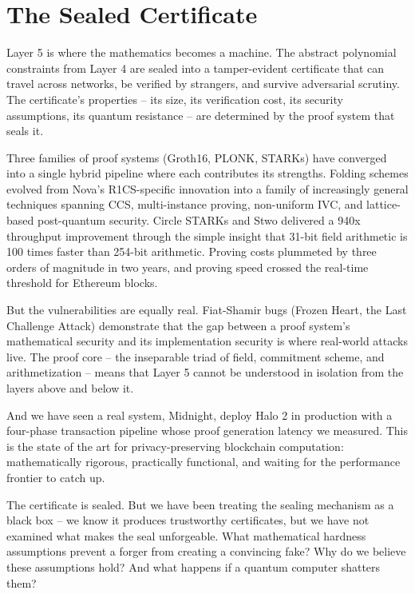 \documentclass[
  11pt,
  openany]{report}
\begin{document}
\section{The Sealed Certificate}\label{the-sealed-certificate}

Layer 5 is where the mathematics becomes a machine. The abstract polynomial
constraints from Layer 4 are sealed into a tamper-evident certificate that can
travel across networks, be verified by strangers, and survive adversarial
scrutiny. The certificate's properties -- its size, its verification cost, its
security assumptions, its quantum resistance -- are determined by the proof
system that seals it.

Three families of proof systems (Groth16, PLONK, STARKs) have converged into a
single hybrid pipeline where each contributes its strengths. Folding schemes
evolved from Nova's R1CS-specific innovation into a family of increasingly
general techniques spanning CCS, multi-instance proving, non-uniform IVC, and
lattice-based post-quantum security. Circle STARKs and Stwo delivered a 940x
throughput improvement through the simple insight that 31-bit field arithmetic
is 100 times faster than 254-bit arithmetic. Proving costs plummeted by three
orders of magnitude in two years, and proving speed crossed the real-time
threshold for Ethereum blocks.

But the vulnerabilities are equally real. Fiat-Shamir bugs (Frozen Heart, the
Last Challenge Attack) demonstrate that the gap between a proof system's
mathematical security and its implementation security is where real-world
attacks live. The proof core -- the inseparable triad of field, commitment
scheme, and arithmetization -- means that Layer 5 cannot be understood in
isolation from the layers above and below it.

And we have seen a real system, Midnight, deploy Halo 2 in production with a
four-phase transaction pipeline whose proof generation latency we measured. This
is the state of the art for privacy-preserving blockchain computation:
mathematically rigorous, practically functional, and waiting for the performance
frontier to catch up.

The certificate is sealed. But we have been treating the sealing mechanism as a
black box -- we know it produces trustworthy certificates, but we have not
examined what makes the seal unforgeable. What mathematical hardness assumptions
prevent a forger from creating a convincing fake? Why do we believe these
assumptions hold? And what happens if a quantum computer shatters them?
\end{document}
